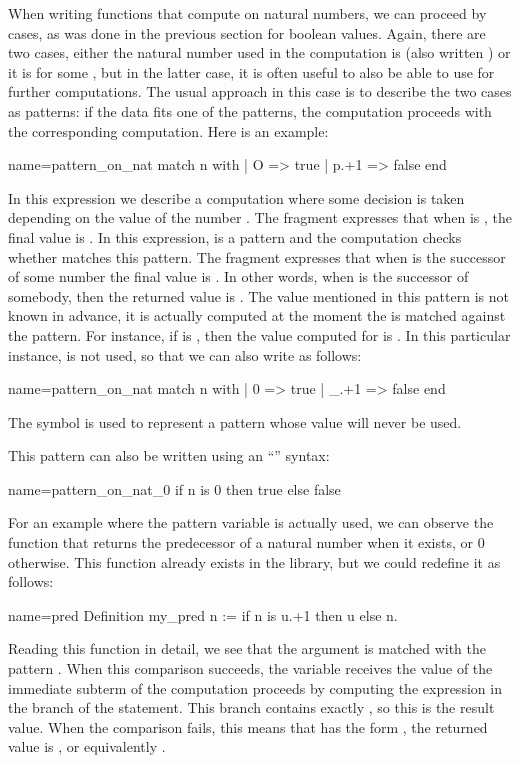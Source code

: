 When writing functions that compute on natural numbers, we can
proceed by cases, as was done in the previous section for boolean
values.  Again, there are two cases, either the natural number used in
the computation is  (also written ) or it is  for
some , but in the latter case, it is often useful to also be able
to use  for further computations.  The usual approach in this
case is to describe the two cases as patterns: if the data fits one of
the patterns, the computation proceeds with the corresponding
computation.  Here is an example:

\begin{coq}{name=pattern_on_nat}{}
match n with | O => true | p.+1 => false end
\end{coq}
In this expression we describe a computation where some decision is
taken depending on the value of the number .  The fragment 
 expresses that when  is , the final value is
.  In this expression,  is a pattern and the computation
checks whether  matches this pattern.  The fragment
  expresses that when  is the successor of
some number  the final value is .  In other words, when
 is the successor of somebody, then the returned value is
.  The value  mentioned in this pattern is not known in
advance, it is actually computed at the moment the  is matched
against the pattern.  For instance, if  is , then the value
computed for  is .  In this particular instance,  is
not used, so that we can also write as follows:

\begin{coq}{name=pattern_on_nat}{}
match n with | 0 => true | _.+1 => false end
\end{coq}
The symbol \C{_} is used to represent a pattern whose value will never be
used.

This pattern can also be written using an ``''
syntax:

\begin{coq}{name=pattern_on_nat_0}{}
if n is 0 then true else false
\end{coq}

For an example where the pattern variable is actually used, we can
observe the function that returns the predecessor of a natural number
when it exists, or 0 otherwise.  This function already exists in the library,
but we could redefine it as follows:

\begin{coq}{name=pred}{}
Definition my_pred n := if n is u.+1 then u else n.
\end{coq}
Reading this function in detail, we see that the argument  is
matched with the pattern .  When this comparison
succeeds, the variable  receives the value of the immediate
subterm of  the computation proceeds by computing the expression
in the  branch of the  statement.  This branch contains
exactly , so this is the result value.  When the comparison
fails, this means that  has the form , the returned value is
, or equivalently .

